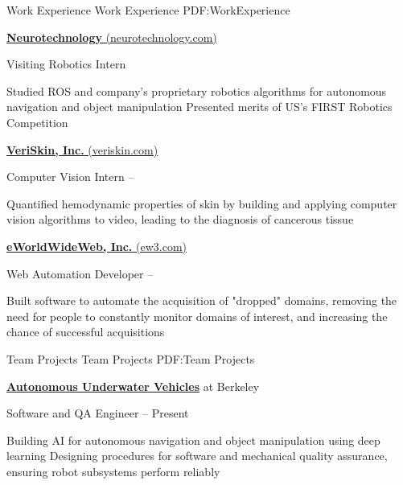 \documentclass[letterpaper,MMMyyyy,nonstopmode]{simpleresumecv}
\begin{document}
\begin{Body}

\Section
{Work Experience}
{Work Experience}
{PDF:WorkExperience}

\Entry
\href{http://www.neurotechnology.com/}
{\textbf{Neurotechnology} (neurotechnology.com)}

\Gap
\BulletItem
Visiting Robotics Intern
\hfill
{}
\begin{Detail}
\SubBulletItem
Studied ROS and company’s proprietary robotics algorithms for autonomous navigation and object manipulation
\SubBulletItem
Presented merits of US's FIRST Robotics Competition
\end{Detail}

\BigGap
\Entry
\href{http://www.veriskin.com/}
{\textbf{VeriSkin, Inc.} (veriskin.com)}

\Gap
\BulletItem
Computer Vision Intern
\hfill
{} --
\begin{Detail}
\SubBulletItem
Quantified hemodynamic properties of skin by building and applying computer vision algorithms to video, leading to the diagnosis of cancerous tissue
\end{Detail}

\BigGap
\Entry
\href{http://ew3.com/}
{\textbf{eWorldWideWeb, Inc.} (ew3.com)}

\Gap
\BulletItem
Web Automation Developer
\hfill
{} --
\begin{Detail}
\SubBulletItem
Built software to automate the acquisition of "dropped" domains, removing the need for people to constantly monitor domains of interest, and increasing the chance of successful acquisitions
\end{Detail}




\Section
{Team Projects}
{Team Projects}
{PDF:Team Projects}

\Entry
\href{https://callink.berkeley.edu/organization/auvs_at_berkeley}
{\textbf{Autonomous Underwater Vehicles}} at
Berkeley

\Gap
\BulletItem
Software and QA Engineer
\hfill
{} --
Present
\begin{Detail}
\SubBulletItem
Building AI for autonomous navigation and object manipulation using deep learning
\SubBulletItem
Designing procedures for software and mechanical quality assurance, ensuring robot subsystems perform reliably 
\end{Detail}


\end{Body}
\end{document}
